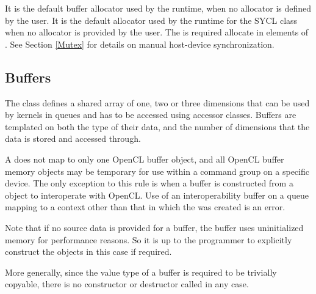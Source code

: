 {
It is the default buffer allocator used by the runtime, when no allocator is
defined by the user.
}
{
It is the default allocator used by the runtime for the SYCL  class when no allocator is provided by the user.
The  is required allocate in elements of .
}
\completeTable
See Section \ref{Mutex} for details on manual host-device synchronization.


\subsection{Buffers}
\label{subsec:buffers}

The  class defines a shared array of one, two or three
dimensions that can be used by kernels in queues and has to be accessed using
\gls{accessor} classes. Buffers are templated on both the type of their data,
and the number of dimensions that the data is stored and accessed through.

A  does not map to only one OpenCL buffer
object, and all OpenCL buffer memory objects may be temporary for use
within a command group on a specific device. The only exception to
this rule is when a buffer is constructed from a 
object to interoperate with OpenCL. Use of an interoperability
buffer on a queue mapping to a context other than that in which the
 was created is an error.

Note that if no source data is provided for a buffer, the buffer uses
uninitialized memory for performance reasons. So it is up to the
programmer to explicitly construct the objects in this case if
required.

More generally, since the value type of a buffer is required to be
trivially copyable, there is no constructor or destructor called in
any case.

